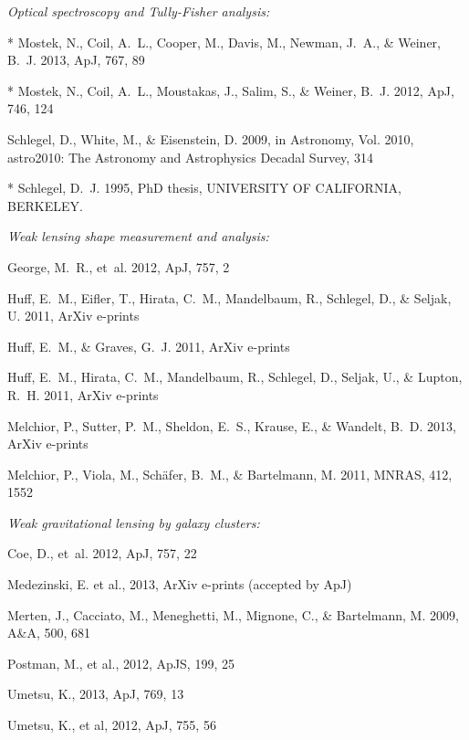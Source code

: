 \documentclass[12pt]{article}
\begin{document}
{\small
\begin{description}
\item \textit{Optical spectroscopy and Tully-Fisher analysis:}
  \begin{description}
  \item {}, N., {Coil}, A.~L., {Cooper}, M., {Davis}, M., {Newman}, J.~A., \&
    {Weiner}, B.~J. 2013, ApJ, 767, 89
  \item {}, N., {Coil}, A.~L., {Moustakas}, J., {Salim}, S., \& {Weiner}, B.~J.
    2012, ApJ, 746, 124
  \item {Schlegel}, D., {White}, M., \& {Eisenstein}, D. 2009, in Astronomy, Vol. 2010,
    astro2010: The Astronomy and Astrophysics Decadal Survey, 314
  \item {}, D.~J. 1995, PhD thesis, UNIVERSITY OF CALIFORNIA, BERKELEY.
  \end{description}
\item \textit{Weak lensing shape measurement and analysis:}
  \begin{description}
  \item {George}, M.~R., {et~al.} 2012, ApJ, 757, 2
  \item {Huff}, E.~M., {Eifler}, T., {Hirata}, C.~M., {Mandelbaum}, R., {Schlegel}, D.,
    \& {Seljak}, U. 2011{}, ArXiv e-prints
  \item {Huff}, E.~M., \& {Graves}, G.~J. 2011, ArXiv e-prints
  \item {Huff}, E.~M., {Hirata}, C.~M., {Mandelbaum}, R., {Schlegel}, D., {Seljak}, U.,
    \& {Lupton}, R.~H. 2011{}, ArXiv e-prints
  \item {Melchior}, P., {Sutter}, P.~M., {Sheldon}, E.~S., {Krause}, E., \& {Wandelt},
    B.~D. 2013, ArXiv e-prints
  \item {Melchior}, P., {Viola}, M., {Sch{\"a}fer}, B.~M., \& {Bartelmann}, M. 2011,
    MNRAS, 412, 1552
  \end{description}
\item \textit{Weak gravitational lensing by galaxy clusters:}
  \begin{description}
  \item {Coe}, D., {et~al.} 2012, ApJ, 757, 22
  \item Medezinski, E. et al., 2013, ArXiv e-prints (accepted by ApJ)
  \item {Merten}, J., {Cacciato}, M., {Meneghetti}, M., {Mignone}, C., \& {Bartelmann},
    M. 2009, A\&A, 500, 681
  \item Postman, M., et al., 2012, ApJS, 199, 25
  \item Umetsu, K., 2013, ApJ, 769, 13 
  \item Umetsu, K., et al, 2012, ApJ, 755, 56
    \end{description}
\end{description}
}
\end{document}
